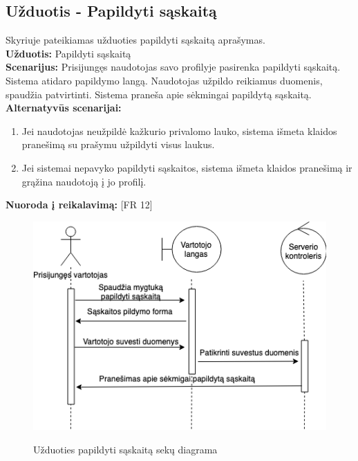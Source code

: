 \documentclass{VUMIFPSkursinis}
\begin{document}
	\subsection{Užduotis - Papildyti sąskaitą}
	Skyriuje pateikiamas užduoties papildyti sąskaitą aprašymas.\\
	\textbf{Užduotis:}  Papildyti sąskaitą \\
	\textbf{Scenarijus:}  Prisijungęs naudotojas savo profilyje pasirenka papildyti sąskaitą. Sistema atidaro papildymo langą. Naudotojas užpildo reikiamus duomenis, spaudžia patvirtinti. Sistema praneša apie sėkmingai papildytą sąskaitą.  \\
	\textbf{Alternatyvūs scenarijai:}
	\begin{enumerate}
		\item Jei naudotojas neužpildė kažkurio privalomo lauko, sistema išmeta klaidos pranešimą su prašymu užpildyti visus laukus.
		\item Jei sistemai nepavyko papildyti sąskaitos, sistema išmeta klaidos pranešimą ir grąžina naudotoją į jo profilį.
	\end{enumerate}
	\textbf{Nuoroda į reikalavimą: } [FR 12]
	
	
		\begin{figure}[H]
		\centering
		\includegraphics[width=\linewidth]{img/fillAccountSequence.png}
		\label{fig:sask}
		\caption{Užduoties papildyti sąskaitą sekų diagrama}
	\end{figure}
\end{document}

